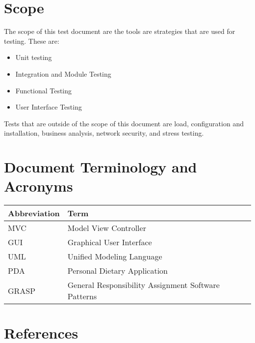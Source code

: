 \documentclass{scrreprt}
\begin{document}
    \section{Scope}
    The scope of this test document are the tools are strategies that are used for testing. These are:
    \begin{itemize}
        \item Unit testing
        \item Integration and Module Testing
        \item Functional Testing
        \item User Interface Testing
    \end{itemize}
    Tests that are outside of the scope of this document are load, configuration and installation, business analysis, network security, and stress testing.


    \section{Document Terminology and Acronyms}

    \begin{tabular}{|l|l|}
        \hline
        \textbf{Abbreviation} & \textbf{Term} \\
        \hline
        MVC & Model View Controller \\
        \hline
        GUI & Graphical User Interface \\
        \hline
        UML & Unified Modeling Language \\
        \hline
        PDA & Personal Dietary Application \\
        \hline
        GRASP & General Responsibility Assignment Software Patterns \\
        \hline
    \end{tabular}

    \section{References}
\end{document}
